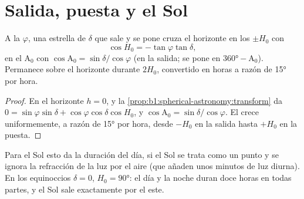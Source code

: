\section{Salida, puesta y el Sol}

\begin{proposition}\label{prop:b1:spherical-astronomy:rising}
A la  $\varphi$, una estrella de  $\delta$ que sale y se pone
cruza el horizonte en los  $\pm H_0$ con
\[
  \cos H_0 = -\tan\varphi\tan\delta ,
\]
en el  $\mathrm{A}_0$ con $\cos\mathrm{A}_0 = \sin\delta/\cos\varphi$
(en la salida; se pone en $\ang{360} - \mathrm{A}_0$). Permanece sobre el horizonte
durante $2H_0$, convertido en horas a razón de \ang{15} por hora.
\end{proposition}

\begin{proof}
En el horizonte $h = 0$, y la \cref{prop:b1:spherical-astronomy:transform} da
$0 = \sin\varphi\sin\delta + \cos\varphi\cos\delta\cos H_0$, y
$\cos\mathrm{A}_0 = \sin\delta/\cos\varphi$. El  crece uniformemente,
a razón de \ang{15} por hora, desde $-H_0$ en la salida hasta $+H_0$ en la puesta.
\end{proof}

Para el Sol esto da la duración del día, si el Sol se trata como un punto y se
ignora la refracción de la luz por el aire (que añaden unos minutos de luz
diurna). En los equinoccios $\delta = 0$, $H_0 = \ang{90}$: el día y la noche duran
doce horas en todas partes, y el Sol sale exactamente por el este.

